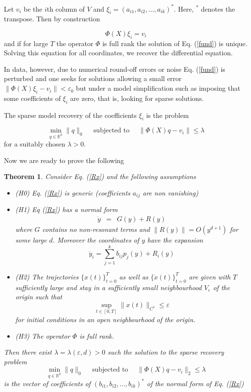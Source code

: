 \documentclass[12pt]{article}
\theoremstyle{plain}
\newtheorem{thr}{Theorem}[section]
\theoremstyle{definition}
\theoremstyle{remark}
\theoremstyle{remark}
\begin{document}
Let $v_i$ be the $i$th column of $V$ and $\xi_i = (a_{i1}, a_{i2}, \dots, a_{ik})^*$. Here, $^*$ denotes the transpose. Then by construction

\begin{equation}\label{fund}
\Phi (X) \xi_i = v_i
\end{equation}
\noindent
and if for large $T$ the operator $\Phi$ is full rank the solution of Eq. (\ref{fund}) is unique. 
Solving this equation for all coordinates, we recover the differential equation. 

In data, however, due to numerical round-off errors or noise Eq. (\ref{fund}) is perturbed and one seeks for solutions allowing a small error $\| \Phi (X) \xi_i - v_i \| <\varepsilon_0$ but  under a model simplification such as imposing that some coefficients of $\xi_i$ are zero, that is, looking for sparse solutions. 

The sparse model recovery of the coefficients $\xi_i$ is the problem 

$$
\min_{q \in \mathbb{R}^k} \| q \|_0 \mbox{~ ~ subjected to ~ ~} \| \Phi(X) q -  v_i \|\le\lambda
$$
\noindent
for a suitably chosen $\lambda>0$.

Now we are ready to prove the following

\begin{thr}
Consider Eq. (\ref{Rx}) and the following assumptions
\begin{itemize}
\item[](H0) Eq. (\ref{Rx}) is generic (coefficients $a_{ij}$ are non vanishing)
\item[](H1) Eq (\ref{Rx}) has a normal form
\begin{eqnarray}
\dot y &=& G(y) + R(y)  
\end{eqnarray}
where $G$ contains no non-resonant terms and  $\|R(y)\| = O(y^{d+1})$ for some large $d$. Moreover the coordinates of $y$ have the expansion 
\[
\dot y_i 
= \sum_{j=1}^k b_{ij} p_j(y) + R_i(y)
\]

 
 
\item[](H2) The trajectories $\{x(t)\}_{t=0}^T$ as well as $\{\dot x(t)\}_{t=0}^T$
are given with $T$ sufficiently large and stay in a sufficiently small neighbourhood $V_{\varepsilon}$ of the origin such that 
$$
\sup_{t\in[0,T]} \| x(t) \|_{C^1} \le \varepsilon 
$$
for initial conditions in an open neighbourhood of the origin. 

\item[](H3) The operator $\Phi$ is full rank. 
\end{itemize}
Then there exist  $\lambda = \lambda (\varepsilon,d)>0$  such the solution to the sparse recovery problem 
$$
\min_{q \in \mathbb{R}^k} \| q \|_0 \mbox{~ ~ subjected to ~ ~} \| \Phi(X) q -  v_i \|_2 \le \lambda 
$$
is the vector of coefficients of $(b_{i1},b_{i2}, \dots, b_{ik})^*$ of  the normal form of Eq. (\ref{Rx})
\end{thr}
\end{document}
